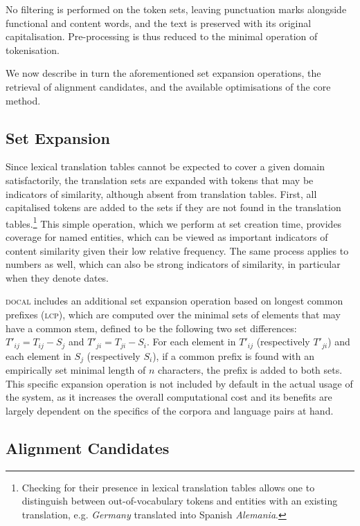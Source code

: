 \documentclass[11pt]{article}
\begin{document}
No filtering is performed on the token sets, leaving punctuation marks alongside functional and content words, and the text is preserved with its original capitalisation. Pre-processing is thus reduced to the minimal operation of tokenisation. 

We now describe in turn the aforementioned set expansion operations, the retrieval of alignment candidates, and the available optimisations of the core method. 

\subsection{Set Expansion} 
\label{expa}

Since lexical translation tables cannot be expected to cover a given domain satisfactorily, the translation sets are expanded with tokens that may be indicators of similarity, although absent from translation tables. First, all capitalised tokens are added to the sets if they are not found in the translation tables.\footnote{Checking for their presence in lexical translation tables allows one to distinguish between out-of-vocabulary tokens and entities with an existing translation, e.g. \textit{Germany} translated into Spanish \textit{Alemania}.} This simple operation, which we perform at set creation time, provides coverage for named entities, which can be viewed as important indicators of content similarity given their low relative frequency. The same process applies to numbers as well, which can also be strong indicators of similarity, in particular when they denote dates.

\textsc{docal} includes an additional set expansion operation based on longest common prefixes (\textsc{lcp}), which are computed over the minimal sets of elements that may have a common stem, defined to be the following two set differences: $T'_{ij} = T_{ij} - S_j$ and $T'_{ji} = T_{ji} - S_i$. For each element in $T'_{ij}$ (respectively $T'_{ji}$) and each element in $S_j$ (respectively $S_i$), if a common prefix is found with an empirically set minimal length of $n$ characters, the prefix is added to both sets. This specific expansion operation is not included by default in the actual usage of the system, as it increases the overall computational cost and its benefits are largely dependent on the specifics of the corpora and language pairs at hand.

\subsection{Alignment Candidates} 
\label{cands}
\end{document}
